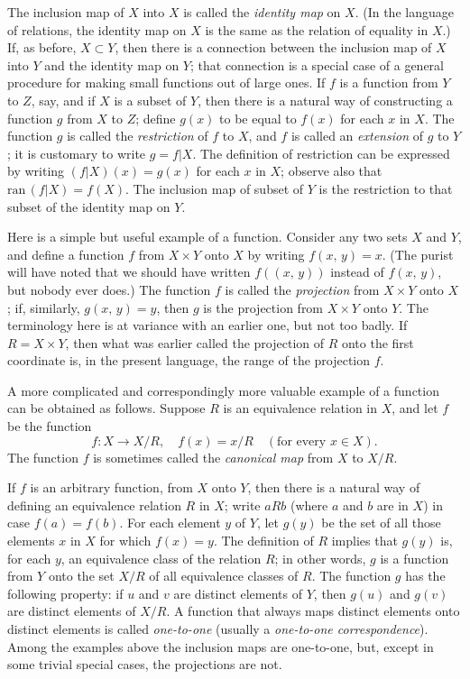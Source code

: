 The inclusion map of $X$ into $X$ is called the \textit{identity map} on $X$. (In the language of relations, the identity map on $X$ is the same as the relation of equality in $X$.) If, as before, $X \subset Y$, then there is a connection between the inclusion map of $X$ into $Y$ and the identity map on $Y$; that connection is a special case of a general procedure for making small functions out of large ones. If $f$ is a function from $Y$ to $Z$, say, and if $X$ is a subset of $Y$, then there is a natural way of constructing a function $g$ from $X$ to $Z$; define $g(x)$ to be equal to $f(x)$ for each $x$ in $X$. The function $g$ is called the \textit{restriction} of $f$ to $X$, and $f$ is called an \textit{extension} of $g$ to $Y$; it is customary to write $g = f | X$. The definition of restriction can be expressed by writing $(f | X)(x) = g(x)$ for each $x$ in $X$; observe also that $\text{ran} \, (f | X) = f(X)$. The inclusion map of subset of $Y$ is the restriction to that subset of the identity map on $Y$.

Here is a simple but useful example of a function. Consider any two sets $X$ and $Y$, and define a function $f$ from $X \times Y$ onto $X$ by writing $f(x, \, y) = x$. (The purist will have noted that we should have written $f((x, \, y))$ instead of $f(x, \, y)$, but nobody ever does.) The function $f$ is called the \textit{projection} from $X \times Y$ onto $X$; if, similarly, $g(x, \, y) = y$, then $g$ is the projection from $X \times Y$ onto $Y$. The terminology here is at variance with an earlier one, but not too badly. If $R = X \times Y$, then what was earlier called the projection of $R$ onto the first coordinate is, in the present language, the range of the projection $f$.

A more complicated and correspondingly more valuable example of a function can be obtained as follows. Suppose $R$ is an equivalence relation in $X$, and let $f$ be the function
\[
	f : X \to X/R, \quad f(x) = x / R \quad (\text{for every } x \in X).
\]
The function $f$ is sometimes called the \textit{canonical map} from $X$ to $X / R$.

If $f$ is an arbitrary function, from $X$ onto $Y$, then there is a natural way of defining an equivalence relation $R$ in $X$; write $aRb$ (where $a$ and $b$ are in $X$) in case $f(a) = f(b)$. For each element $y$ of $Y$, let $g(y)$ be the set of all those elements $x$ in $X$ for which $f(x) = y$. The definition of $R$ implies that $g(y)$ is, for each $y$, an equivalence class of the relation $R$; in other words, $g$ is a function from $Y$ onto the set $X / R$ of all equivalence classes of $R$. The function $g$ has the following property: if $u$ and $v$ are distinct elements of $Y$, then $g(u)$ and $g(v)$ are distinct elements of $X / R$. A function that always maps distinct elements onto distinct elements is called \textit{one-to-one} (usually a \textit{one-to-one correspondence}). Among the examples above the inclusion maps are one-to-one, but, except in some trivial special cases, the projections are not. 

